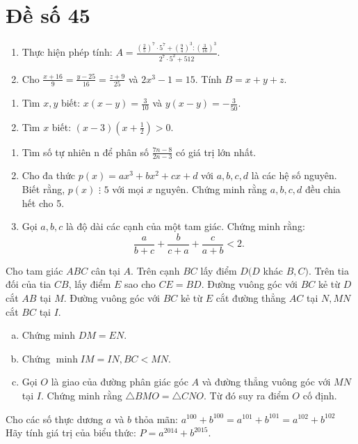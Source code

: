 \section{Đề số 45}

\begin{bt} 
	\hfill
	\begin{enumerate}[1.]
		\item Thực hiện phép tính: $A=\frac{\left(\frac{2}{5}\right)^7 \cdot 5^7+\left(\frac{9}{4}\right)^3:\left(\frac{3}{16}\right)^3}{2^7 \cdot 5^2+512}$.
		\item Cho $\frac{x+16}{9}=\frac{y-25}{16}=\frac{z+9}{25}$ và $2 x^3-1=15$. Tính $B=x+y+z$.
	\end{enumerate}
	\loigiai{} 
\end{bt}

\begin{bt}
	\hfill
	\begin{enumerate}[1.]
		\item Tìm $x, y$ biết: $x(x-y)=\frac{3}{10}$ và $y(x-y)=-\frac{3}{50}$.
		\item Tìm $x$ biết: $(x-3)\left(x+\frac{1}{2}\right)>0$.
	\end{enumerate}
	\loigiai{} 
\end{bt}

\begin{bt}
	\hfill
	\begin{enumerate}[1.]
		\item Tìm số tự nhiên n để phân số $\frac{7 n-8}{2 n-3}$ có giá trị lớn nhất.
		\item Cho đa thức $p(x)=a x^3+b x^2+c x+d$ với $a, b, c, d$ là các hệ số nguyên. Biết rằng, $p(x)$ $\vdots$ $ 5$ với mọi $x$ nguyên. Chứng minh rằng $a, b, c, d$ đều chia hết cho 5.
		\item Gọi $a, b, c$ là độ dài các cạnh của một tam giác. Chứng minh rằng:
		$$
		\frac{a}{b+c}+\frac{b}{c+a}+\frac{c}{a+b}<2 .
		$$
	\end{enumerate}
	
	\loigiai{} 
\end{bt}

\begin{bt}
	Cho tam giác $A B C$ cân tại $A$. Trên cạnh $B C$ lấy điểm $D(D$ khác $B, C)$. Trên tia đối của tia $C B$, lấy điểm $E$ sao cho $C E=B D$. Đường vuông góc với $B C$ kẻ từ $D$ cắt $A B$ tại $M$. Đường vuông góc với $B C$ kẻ từ $E$ cắt đường thẳng $A C$ tại $N, M N$ cắt $B C$ tại $I$.
	\begin{enumerate}[a.]
		\item Chứng minh $D M=E N$.
		\item Chứng $\operatorname{minh} I M=I N, B C<M N$.
		\item Gọi $O$ là giao của đường phân giác góc $A$ và đường thẳng vuông góc với $M N$ tại $I$. Chứng minh rằng $\triangle B M O=\triangle C N O$. Từ đó suy ra điểm $O$ cố định.
	\end{enumerate}
	\loigiai{}
\end{bt}

\begin{bt}
	Cho các số thực dương $a$ và $b$ thỏa mãn: $a^{100}+b^{100}=a^{101}+b^{101}=a^{102}+b^{102}$ \\Hãy tính giá trị của biểu thức: $P=a^{2014}+b^{2015}$.
	\loigiai{}
\end{bt}
